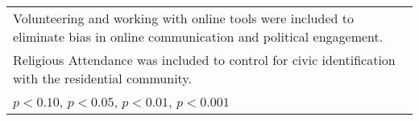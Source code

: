 \begin{table}[htbp]
\begin{tabular}{l*{8}{c}}
\multicolumn{9}{l}{\footnotesize Volunteering and working with online tools were included to eliminate bias in online communication and political engagement.}\\
\multicolumn{9}{l}{\footnotesize Religious Attendance was included to control for civic identification with the residential community.}\\
\multicolumn{9}{l}{\footnotesize \sym{^+} \(p<0.10\), \sym{*} \(p<0.05\), \sym{**} \(p<0.01\), \sym{***} \(p<0.001\)}\\
\end{tabular}
\end{table}
